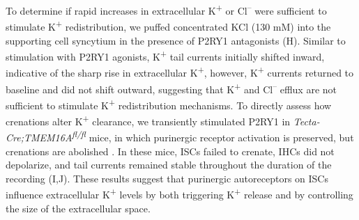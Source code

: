 \documentclass[9pt,lineno]{elife}
\begin{document}
To determine if rapid increases in extracellular K\textsuperscript{+} or Cl\textsuperscript{--} were sufficient to stimulate K\textsuperscript{+} redistribution, we puffed concentrated KCl (130 mM) into the supporting cell syncytium in the presence of P2RY1 antagonists (H). Similar to stimulation with P2RY1 agonists, K\textsuperscript{+} tail currents initially shifted inward, indicative of the sharp rise in extracellular K\textsuperscript{+}, however, K\textsuperscript{+} currents returned to baseline and did not shift outward, suggesting that K\textsuperscript{+} and Cl\textsuperscript{--} efflux are not sufficient to stimulate K\textsuperscript{+} redistribution mechanisms. To directly assess how crenations alter K\textsuperscript{+} clearance, we transiently stimulated P2RY1 in \textit{Tecta-Cre;TMEM16A\textsuperscript{fl/fl}} mice, in which purinergic receptor activation is preserved, but crenations are abolished \citep{Wang2015}. In these mice, ISCs failed to crenate, IHCs did not depolarize, and tail currents remained stable throughout the duration of the recording (I,J). These results suggest that purinergic autoreceptors on ISCs influence extracellular K\textsuperscript{+} levels by both triggering K\textsuperscript{+} release and by controlling the size of the extracellular space.
\end{document}
